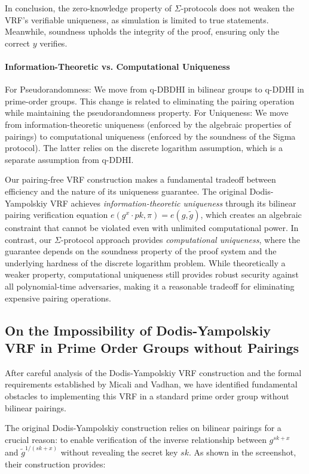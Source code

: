 In conclusion, the zero-knowledge property of $\Sigma$-protocols does not weaken the VRF's verifiable uniqueness, as simulation is limited to true statements. Meanwhile, soundness upholds the integrity of the proof, ensuring only the correct $y$ verifies.

\paragraph{Information-Theoretic vs. Computational Uniqueness} 
For Pseudorandomness: We move from q-DBDHI in bilinear groups to q-DDHI in prime-order groups. This change is related to eliminating the pairing operation while maintaining the pseudorandomness property.
For Uniqueness: We move from information-theoretic uniqueness (enforced by the algebraic properties of pairings) to computational uniqueness (enforced by the soundness of the Sigma protocol). The latter relies on the discrete logarithm assumption, which is a separate assumption from q-DDHI.


Our pairing-free VRF construction makes a fundamental tradeoff between efficiency and the nature of its uniqueness guarantee. The original Dodis-Yampolskiy VRF achieves \emph{information-theoretic uniqueness} through its bilinear pairing verification equation $e(g^x \cdot pk, \pi) = e(g, \tilde{g})$, which creates an algebraic constraint that cannot be violated even with unlimited computational power. In contrast, our $\Sigma$-protocol approach provides \emph{computational uniqueness}, where the guarantee depends on the soundness property of the proof system and the underlying hardness of the discrete logarithm problem. While theoretically a weaker property, computational uniqueness still provides robust security against all polynomial-time adversaries, making it a reasonable tradeoff for eliminating expensive pairing operations.


\subsection{On the Impossibility of Dodis-Yampolskiy VRF in Prime Order Groups without Pairings}

After careful analysis of the Dodis-Yampolskiy VRF construction and the formal requirements established by Micali and Vadhan, we have identified fundamental obstacles to implementing this VRF in a standard prime order group without bilinear pairings.

The original Dodis-Yampolskiy construction relies on bilinear pairings for a crucial reason: to enable verification of the inverse relationship between $g^{sk+x}$ and $\tilde{g}^{1/(sk+x)}$ without revealing the secret key $sk$. As shown in the screenshot, their construction provides:

